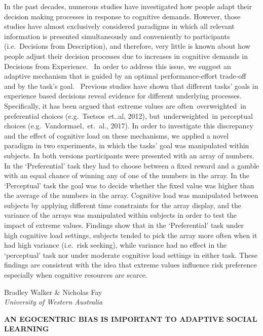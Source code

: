 \documentclass[]{article}
\begin{document}
In the past decades, numerous studies have investigated how people adapt
their decision making processes in response to cognitive demands.
However, those studies have almost exclusively considered paradigms in
which all relevant information is presented simultaneously and
conveniently to participants (i.e.~Decisions from Description), and
therefore, very little is known about how people adjust their decision
processes due to increases in cognitive demands in Decisions from
Experience.~ In order to address this issue, we suggest an adaptive
mechanism that is guided by an optimal performance-effort trade-off and
by the task's goal.~ Previous studies have shown that different tasks'
goals in experience based decisions reveal evidence for different
underlying processes. Specifically, it has been argued that extreme
values are often~overweighted~in preferential choices
(e.g.~Tsetsos~et..al, 2012), but~underweighted~in perceptual choices
(e.g.~Vandormael,~et.~al., 2017). In order to investigate this
discrepancy and the effect of cognitive load on these mechanisms, we
applied a novel paradigm in two experiments, in which the tasks' goal
was manipulated within subjects. In both versions participants were
presented with an array of numbers. In the `Preferential' task they had
to choose between a fixed reward and a gamble with an equal chance of
winning any of one of the numbers in the array. In the `Perceptual' task
the goal was to decide whether the fixed value was higher than the
average of the numbers in the array. Cognitive load was manipulated
between subjects by applying different time constraints for the array
display, and the variance of the arrays was manipulated within subjects
in order to test the impact of extreme values. Findings show that in the
`Preferential' task under high cognitive load settings, subjects tended
to pick the array more often when it had high variance (i.e.~risk
seeking), while variance had no effect in the `perceptual' task nor
under moderate cognitive load settings in either task. These findings
are consistent with the idea that extreme values influence risk
preference especially when cognitive resources are scarce.\\
\pagebreak  

Bradley Walker \& Nicholas Fay\\
\emph{University of Western Australia}

\textbf{AN EGOCENTRIC BIAS IS IMPORTANT TO ADAPTIVE SOCIAL LEARNING}
\end{document}
